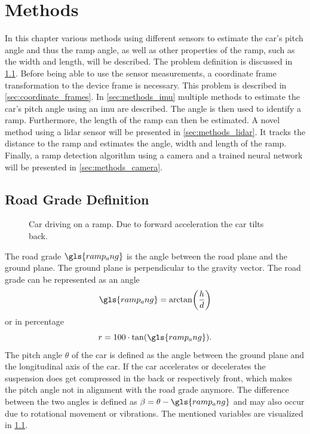 \chapter{Methods}
\label{ch:Methods}

In this chapter various methods using different sensors to estimate the car's pitch angle and thus the ramp angle, as well as other properties of the ramp, such as the width and length, will be described.
The problem definition is discussed in \cref{sec:road_grade_definition}.
Before being able to use the sensor measurements, a coordinate frame transformation to the device frame is necessary.
This problem is described in \cref{sec:coordinate_frames}.
In \cref{sec:methods_imu} multiple methods to estimate the car's pitch angle using an \gls{imu} are described.
The angle is then used to identify a ramp.
Furthermore, the length of the ramp can then be estimated.
A novel method using a \gls{lidar} sensor will be presented in \cref{sec:methods_lidar}.
It tracks the distance to the ramp and estimates the angle, width and length of the ramp.
Finally, a ramp detection algorithm using a camera and a trained neural network will be presented in \cref{sec:methods_camera}.


\section{Road Grade Definition}
\label{sec:road_grade_definition}
\begin{figure}[b]
    \centering
    
    \caption[Ramp angle definition]{Car driving on a ramp. Due to forward acceleration the car tilts back.}
    \label{fig:tikz_car_tilt}
\end{figure}
The road grade $\gls{ramp_ang}$ is the angle between the road plane and the ground plane.
The ground plane is perpendicular to the gravity vector.
The road grade can be represented as an angle
\begin{equation}
    \gls{ramp_ang} = \arctan(\frac{h}{d})
\end{equation}
or in percentage
\begin{equation}
    r = 100\cdot\tan(\gls{ramp_ang}).
\end{equation}
The pitch angle $\theta$ of the car is defined as the angle between the ground plane and the longitudinal axis of the car.
If the car accelerates or decelerates the suspension does get compressed in the back or respectively front, which makes the pitch angle not in alignment with the road grade anymore.
The difference between the two angles is defined as $\beta = \theta- \gls{ramp_ang}$ and may also occur due to rotational movement or vibrations.
The mentioned variables are visualized in \cref{fig:tikz_car_tilt}.



